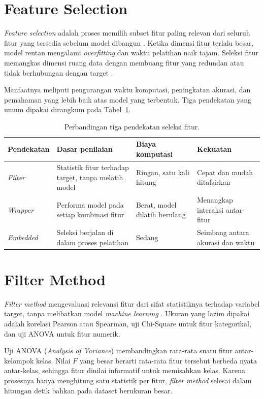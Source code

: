 \documentclass[a4paper,oneside,12pt]{report}
\begin{document}
\section{Feature Selection}
\textit{Feature selection} adalah proses memilih subset fitur paling relevan dari seluruh fitur yang tersedia sebelum model dibangun \cite{pratama2023}. Ketika dimensi fitur terlalu besar, model rentan mengalami \textit{overfitting} dan waktu pelatihan naik tajam. Seleksi fitur memangkas dimensi ruang data dengan membuang fitur yang redundan atau tidak berhubungan dengan target \cite{guyon2003}.

Manfaatnya meliputi pengurangan waktu komputasi, peningkatan akurasi, dan pemahaman yang lebih baik atas model yang terbentuk. Tiga pendekatan yang umum dipakai dirangkum pada Tabel~\ref{tab:metode-fs}.

\begin{table}[htbp]
\centering
\caption{Perbandingan tiga pendekatan seleksi fitur.}
\label{tab:metode-fs}
\small
\begin{tabularx}{\linewidth}{|l|>{\raggedright\arraybackslash}X|>{\raggedright\arraybackslash}X|>{\raggedright\arraybackslash}X|}
\hline
\textbf{Pendekatan} & \textbf{Dasar penilaian} & \textbf{Biaya komputasi} & \textbf{Kekuatan} \\
\hline
\textit{Filter} & Statistik fitur terhadap target, tanpa melatih model & Ringan, satu kali hitung & Cepat dan mudah ditafsirkan \\
\hline
\textit{Wrapper} & Performa model pada setiap kombinasi fitur & Berat, model dilatih berulang & Menangkap interaksi antar-fitur \\
\hline
\textit{Embedded} & Seleksi berjalan di dalam proses pelatihan & Sedang & Seimbang antara akurasi dan waktu \\
\hline
\end{tabularx}
\end{table}

\section{Filter Method}
\textit{Filter method} mengevaluasi relevansi fitur dari sifat statistiknya terhadap variabel target, tanpa melibatkan model \textit{machine learning} \cite{guyon2003}. Ukuran yang lazim dipakai adalah korelasi Pearson atau Spearman, uji Chi-Square untuk fitur kategorikal, dan uji ANOVA untuk fitur numerik.

Uji ANOVA (\textit{Analysis of Variance}) membandingkan rata-rata suatu fitur antar-kelompok kelas. Nilai $F$ yang besar berarti rata-rata fitur tersebut berbeda nyata antar-kelas, sehingga fitur dinilai informatif untuk memisahkan kelas. Karena prosesnya hanya menghitung satu statistik per fitur, \textit{filter method} selesai dalam hitungan detik bahkan pada dataset berukuran besar.
\end{document}
